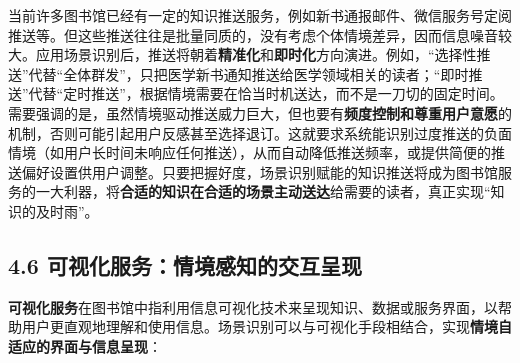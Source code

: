 \documentclass[
  letterpaper,
]{scrbook}
\begin{document}
当前许多图书馆已经有一定的知识推送服务，例如新书通报邮件、微信服务号定阅推送等。但这些推送往往是批量同质的，没有考虑个体情境差异，因而信息噪音较大。应用场景识别后，推送将朝着\textbf{精准化}和\textbf{即时化}方向演进。例如，``选择性推送''代替``全体群发''，只把医学新书通知推送给医学领域相关的读者；``即时推送''代替``定时推送''，根据情境需要在恰当时机送达，而不是一刀切的固定时间。需要强调的是，虽然情境驱动推送威力巨大，但也要有\textbf{频度控制和尊重用户意愿}的机制，否则可能引起用户反感甚至选择退订。这就要求系统能识别过度推送的负面情境（如用户长时间未响应任何推送），从而自动降低推送频率，或提供简便的推送偏好设置供用户调整。只要把握好度，场景识别赋能的知识推送将成为图书馆服务的一大利器，将\textbf{合适的知识在合适的场景主动送达}给需要的读者，真正实现``知识的及时雨''。

\subsection{4.6
可视化服务：情境感知的交互呈现}\label{ux53efux89c6ux5316ux670dux52a1ux60c5ux5883ux611fux77e5ux7684ux4ea4ux4e92ux5448ux73b0}

\textbf{可视化服务}在图书馆中指利用信息可视化技术来呈现知识、数据或服务界面，以帮助用户更直观地理解和使用信息。场景识别可以与可视化手段相结合，实现\textbf{情境自适应的界面与信息呈现}：
\end{document}

